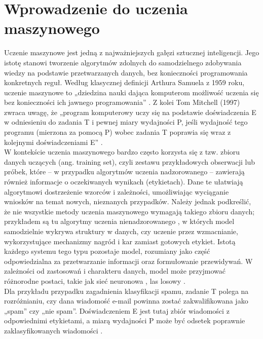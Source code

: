 \documentclass[a4paper, 12pt]{article}
\numberwithin{equation}{section}
\begin{document}
    \section{Wprowadzenie do uczenia maszynowego}
    Uczenie maszynowe jest jedną z najważniejszych gałęzi sztucznej inteligencji.
    Jego istotę stanowi tworzenie algorytmów zdolnych do samodzielnego zdobywania wiedzy na podstawie przetwarzanych danych, bez konieczności programowania konkretnych reguł. 
    Według klasycznej definicji Arthura Samuela z 1959 roku, uczenie maszynowe to „dziedzina nauki dająca komputerom możliwość uczenia się bez konieczności ich jawnego programowania” \cite{samuel1959checkers}.
    Z kolei Tom Mitchell (1997) zwraca uwagę, że „program komputerowy uczy się na podstawie doświadczenia E w odniesieniu do zadania T i pewnej miary wydajności P, jeśli wydajność tego programu (mierzona za pomocą P) wobec zadania T poprawia się wraz z kolejnymi doświadczeniami E” \cite{mitchell1997machinelearning}.
    \\ 
    \indent W kontekście uczenia maszynowego bardzo często korzysta się z tzw. zbioru danych uczących (ang. training set), czyli zestawu przykładowych obserwacji lub próbek, które – w przypadku algorytmów uczenia nadzorowanego \cite{chollet2021deep} – zawierają również informacje o oczekiwanych wynikach (etykietach). Dane te ułatwiają algorytmowi dostrzeżenie wzorców i zależności, umożliwiając wyciąganie wniosków na temat nowych, nieznanych przypadków. Należy jednak podkreślić, że nie wszystkie metody uczenia maszynowego wymagają takiego zbioru danych; przykładem są tu algorytmy uczenia nienadzorowanego \cite{chollet2021deep}, w których model samodzielnie wykrywa struktury w danych, czy uczenie przez wzmacnianie, wykorzystujące mechanizmy nagród i kar zamiast gotowych etykiet. Istotą każdego systemu tego typu pozostaje model, rozumiany jako część odpowiedzialna za przetwarzanie informacji oraz formułowanie przewidywań. W zależności od zastosowań i charakteru danych, model może przyjmować różnorodne postaci, takie jak sieć neuronowa \cite{goodfellow2016deep}, las losowy \cite{breiman2001random}.
    \\
    \indent Dla przykładu przypadku zagadnienia klasyfikacji spamu, zadanie T polega na rozróżnianiu, czy dana wiadomość e-mail powinna zostać zakwalifikowana jako „spam” czy „nie spam”. 
    Doświadczeniem E jest tutaj zbiór wiadomości z odpowiednimi etykietami, a miarą wydajności P może być odsetek poprawnie zaklasyfikowanych wiadomości \cite{HandsOnMachineLearning}.
    
\end{document}
